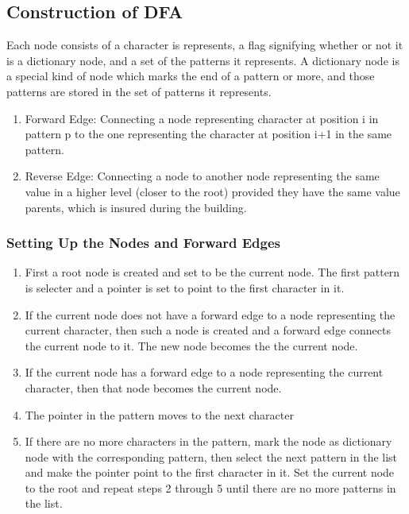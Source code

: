 \documentclass[paper=a4, fontsize=11pt]{scrartcl} %
\numberwithin{equation}{section} %
\numberwithin{figure}{section} %
\numberwithin{table}{section} %
\begin{document}
\subsection{Construction of DFA}
\label{sec:dfa_const}
\par Each node consists of a character is represents, a flag signifying whether or not it is a dictionary node, and a set of the patterns it represents. A dictionary node is a special kind of node which marks the end of a pattern or more, and those patterns are stored in the set of patterns it represents.

\begin{enumerate}
\item Forward Edge: Connecting a node representing character at position i in pattern p to the one representing the character at position i+1 in the same pattern.
\item Reverse Edge: Connecting a node to another node representing the same value in a higher level (closer to the root) provided they have the same value parents, which is insured during the building.
\end{enumerate}

\subsubsection{Setting Up the Nodes and Forward Edges}
\begin{enumerate}
\item First a root node is created and set to be the current node. The first pattern is selecter and a pointer is set to point to the first character in it.

\item If the current node does not have a forward edge to a node representing the current character, then such a node is created and a forward edge connects the current node to it. The new node becomes the the current node.

\item If the current node has a forward edge to a node representing the current character, then that node becomes the current node.

\item The pointer in the pattern moves to the next character

\item If there are no more characters in the pattern, mark the node as dictionary node with the corresponding pattern, then select the next pattern in the list and make the pointer point to the first character in it. Set the current node to the root and repeat steps 2 through 5 until there are no more patterns in the list.
\end{enumerate}
\end{document}
